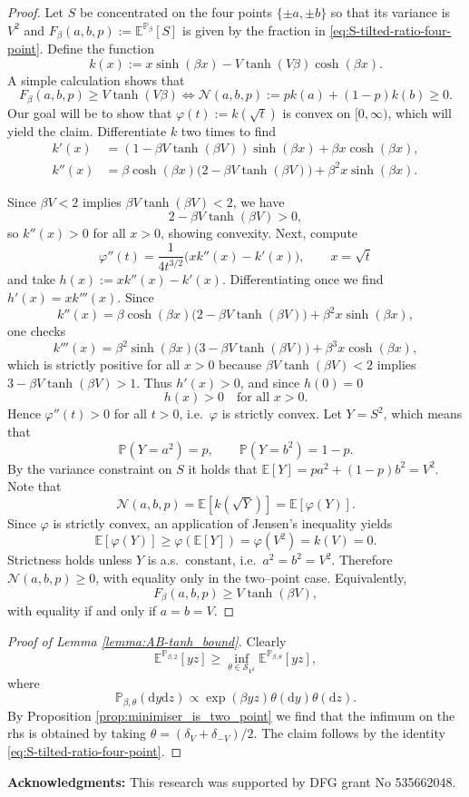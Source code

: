 \documentclass[reqno,11pt]{amsart}
\newcommand{\1}{\mathds{1}}
\theoremstyle{plain}
\theoremstyle{definition}
\numberwithin{equation}{section}
\newcommand{\caN}{{\mathcal N}}
\newcommand{\caS}{{\mathcal S}}
\newcommand{\bbE}{{\mathbb E}}
\newcommand{\bbP}{{\mathbb P}}
\newcommand{\de}{{\mathrm{d}}}
\def\lt{\left}
\def\rt{\right}
\begin{document}
\begin{proof}
    Let $S$ be concentrated on the four points $\{\pm a, \pm b\}$ so that its variance is $V^2$ and 
    $F_{\beta}(a,b,p) :=\bbE^{\bbP_\beta}[S]$ is given by the fraction in \eqref{eq:S-tilted-ratio-four-point}. Define the function
    $$k(x) := x \sinh(\beta x) - V\tanh(V \beta) \cosh(\beta x).$$
    A simple calculation shows that
    $$F_\beta (a,b,p) \ge V \tanh(V \beta) \iff \caN(a,b,p):= pk(a) + (1-p)k(b) \ge 0.$$
    Our goal will be to show that $\varphi(t) := k(\sqrt{t})$ is convex on $[0,\infty)$, which will yield the claim. Differentiate $k$ two times to find
    \begin{align*}
k'(x)
&= (1 - \beta V\tanh(\beta V))\sinh(\beta x) 
   + \beta x\cosh(\beta x), \\
k''(x)
&= \beta\cosh(\beta x)\bigl(2 - \beta V\tanh(\beta V)\bigr)
   + \beta^2 x\sinh(\beta x).
\end{align*}

Since $\beta V<2$ implies $\beta V\tanh(\beta V)<2$, we have
\[
2 - \beta V\tanh(\beta V) > 0,
\]
so $k''(x)>0$ for all $x>0$, showing convexity.
Next, compute
\[
\varphi''(t)
= \frac{1}{4 t^{3/2}}\bigl(xk''(x)-k'(x)\bigr),
\qquad x=\sqrt t
\]
and take $h(x):=xk''(x)-k'(x)$. Differentiating once we find
$h'(x)=xk'''(x)$.
Since
\[
k''(x)
= \beta\cosh(\beta x)\bigl(2 - \beta V\tanh(\beta V)\bigr)
  + \beta^2 x\sinh(\beta x),
\]
one checks
\[
k'''(x)
= \beta^2\sinh(\beta x)\bigl(3 - \beta V\tanh(\beta V)\bigr)
  + \beta^3 x\cosh(\beta x),
\]
which is strictly positive for all $x>0$ because  
$\beta V\tanh(\beta V) < 2$ implies  
$3 - \beta V\tanh(\beta V) > 1$.
Thus $h'(x)>0$, and since $h(0)=0$
\[
h(x)>0 \quad\text{for all }x>0.
\]
Hence $\varphi''(t)>0$ for all $t>0$, i.e.\ $\varphi$ is strictly convex.
Let $Y = S^2$, which means that
\[
\mathbb{P}(Y=a^2)=p,\qquad \mathbb{P}(Y=b^2)=1-p.
\]
By the variance constraint on $S$ it holds that
$\mathbb{E}[Y] = p a^2 + (1-p)b^2 = V^2$.
Note that
\[
\mathcal{N}(a,b,p)
= \mathbb{E}[k(\sqrt Y)]
= \mathbb{E}[\varphi(Y)].
\]
Since $\varphi$ is strictly convex, an application of Jensen's inequality yields
\[
\mathbb{E}[\varphi(Y)]
\ge \varphi(\mathbb{E}[Y])
= \varphi(V^2)
= k(V)
= 0.
\]
Strictness holds unless $Y$ is a.s.\ constant, i.e.\ $a^2=b^2=V^2$.
Therefore $\mathcal{N}(a,b,p)\ge 0$, with equality only in the two--point case.  
Equivalently,
\[
F_\beta(a,b,p) \ge V\tanh(\beta V),
\]
with equality if and only if $a=b=V$.
\end{proof}

\begin{proof}[Proof of Lemma \ref{lemma:AB-tanh_bound}]
    Clearly
    $$\bbE^{\bbP_{\beta,2}}[yz] \ge \inf\limits_{\theta \in \caS_{V^2}} \bbE^{\bbP_{\beta,\theta}} [yz],$$
    where
    $$\bbP_{\beta,\theta}(\de y \de z) \propto \exp \lt( \beta yz  \rt) \theta (\de y) \theta ( \de z).$$
    By Proposition \ref{prop:minimiser_is_two_point} we find that the infimum on the rhs is obtained by taking $\theta = (\delta_V + \delta_{-V})/2$. The claim follows by the identity \eqref{eq:S-tilted-ratio-four-point}.
\end{proof}

{\bf Acknowledgments:} This research was supported by DFG grant No 535662048.


\end{document}
